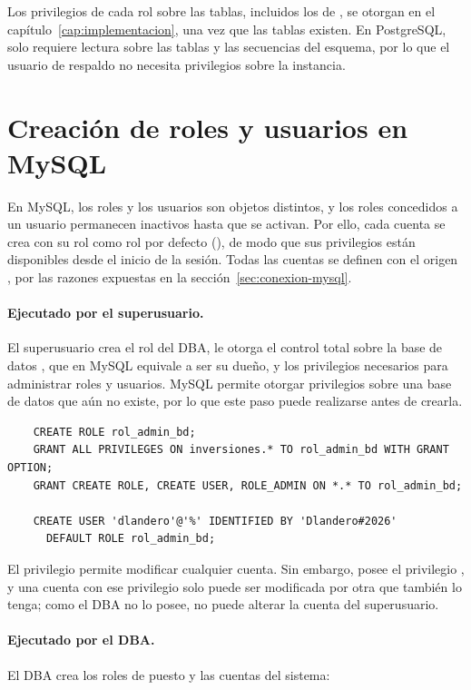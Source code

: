 Los privilegios de cada rol sobre las tablas, incluidos los de , se otorgan en el capítulo~\ref{cap:implementacion}, una vez que las tablas existen. En PostgreSQL,  solo requiere lectura sobre las tablas y las secuencias del esquema, por lo que el usuario de respaldo no
necesita privilegios sobre la instancia.

\section{Creaci\'on de roles y usuarios en MySQL}
\label{sec:roles-mysql}

En MySQL, los roles y los usuarios son objetos distintos, y los roles concedidos a un usuario permanecen inactivos hasta que se activan. Por ello, cada cuenta se crea con su rol como rol por defecto (), de modo que sus privilegios están disponibles desde el inicio de la sesión. Todas las cuentas se definen con el origen , por las razones expuestas en la sección~\ref{sec:conexion-mysql}.

\paragraph{Ejecutado por el superusuario.} El superusuario crea el rol del DBA, le otorga el control total sobre la base de datos , que en MySQL equivale a ser su dueño, y los privilegios necesarios para administrar roles y usuarios. MySQL permite otorgar privilegios sobre una base de datos que aún no existe, por lo que este paso puede realizarse antes de crearla.

\begin{verbatim}
	CREATE ROLE rol_admin_bd;
	GRANT ALL PRIVILEGES ON inversiones.* TO rol_admin_bd WITH GRANT OPTION;
	GRANT CREATE ROLE, CREATE USER, ROLE_ADMIN ON *.* TO rol_admin_bd;

	CREATE USER 'dlandero'@'%' IDENTIFIED BY 'Dlandero#2026'
	  DEFAULT ROLE rol_admin_bd;
\end{verbatim}

El privilegio  permite modificar cualquier cuenta. Sin embargo,  posee el privilegio , y una cuenta con ese privilegio solo puede ser modificada por otra que también lo tenga; como el DBA no lo posee, no puede alterar la cuenta del superusuario.

\paragraph{Ejecutado por el DBA.} El DBA crea los roles de puesto y las cuentas del sistema:

